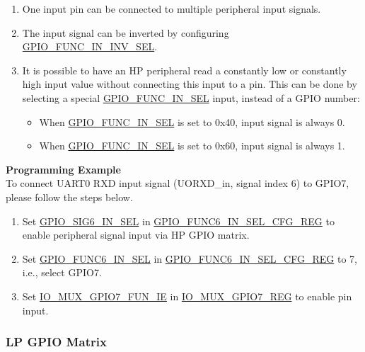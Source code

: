 \documentclass[main\_\_EN.tex]{subfiles}
\begin{document}
\begin{tiplisting}
\vspace{-2em}
\begin{enumerate}
\item \label{input-note-1} One input pin can be connected to multiple peripheral input signals.
\item \label{input-note-2} The input signal can be inverted by configuring \hyperref[fielddesc:GPIOFUNCNININVSEL]{GPIO\_FUNC\_IN\_INV\_SEL}.
\item \label{input-note-3} It is possible to have an HP peripheral read a constantly low or constantly high input value without connecting this input to a pin. This can be done by selecting a special \hyperref[fielddesc:GPIOFUNCMINSEL]{GPIO\_FUNC\_IN\_SEL} input, instead of a GPIO number:
\begin {itemize}
\item When \hyperref[fielddesc:GPIOFUNCMINSEL]{GPIO\_FUNC\_IN\_SEL} is set to 0x40, input signal is always 0.
\item When \hyperref[fielddesc:GPIOFUNCMINSEL]{GPIO\_FUNC\_IN\_SEL} is set to 0x60, input signal is always 1.
\end{itemize}
\end{enumerate}
\end{tiplisting}

\textbf{Programming Example}\\

To connect UART0 RXD input signal (UORXD\_in, signal index 6) to GPIO7, please follow the steps below.

\begin{enumerate}
\item Set \hyperref[regdesc:GPIOFUNCMINSELCFGREG]{GPIO\_SIG6\_IN\_SEL} in \hyperref[fielddesc:GPIOSIGNINSEL]{GPIO\_FUNC6\_IN\_SEL\_CFG\_REG} to enable peripheral signal input via HP GPIO matrix.
\item Set \hyperref[fielddesc:GPIOFUNCMINSEL]{GPIO\_FUNC6\_IN\_SEL} in \hyperref[regdesc:GPIOFUNCMINSELCFGREG]{GPIO\_FUNC6\_IN\_SEL\_CFG\_REG} to 7, i.e., select GPIO7.
\item Set \hyperref[fielddesc:IOMUXGPIONFUNIE]{IO\_MUX\_GPIO7\_FUN\_IE} in \hyperref[regdesc:IOMUXGPIONREG]{IO\_MUX\_GPIO7\_REG} to enable pin input.
\end{enumerate}

\subsubsection{LP GPIO Matrix}
\end{document}
